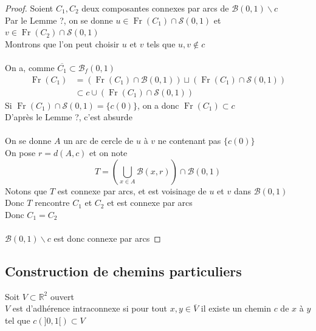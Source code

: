 \documentclass{article}
\begin{document}
\begin{flushleft}
\begin{proof}
    Soient $C_1, C_2$ deux composantes connexes par arcs de $\mathcal{B}(0, 1) \backslash c$\\
    Par le Lemme ?, on se donne $u \in \operatorname{Fr}(C_1) \cap \mathcal{S}(0, 1)$ et
    $v \in \operatorname{Fr}(C_2) \cap \mathcal{S}(0, 1)$\\
    Montrons que l'on peut choisir $u$ et $v$ tels que $u, v \notin c$
    \\~\\
    On a, comme $\overline{C_1} \subset \mathcal{B}_f(0, 1)$
    \begin{align*}
        \operatorname{Fr}(C_1) &= (\operatorname{Fr}(C_1) \cap \mathcal{B}(0, 1))
        \sqcup (\operatorname{Fr}(C_1) \cap \mathcal{S}(0, 1))\\
        &\subset c \cup (\operatorname{Fr}(C_1) \cap \mathcal{S}(0, 1))
    \end{align*}
    Si $\operatorname{Fr}(C_1) \cap \mathcal{S}(0, 1) = \{ c(0) \}$, on a donc $\operatorname{Fr}(C_1) \subset c$\\
    D'après le Lemme ?, c'est absurde
    \\~\\
    On se donne $A$ un arc de cercle de $u$ à $v$ ne contenant pas $\{ c(0) \}$\\
    On pose $r = d(A, c)$ et on note
    \[ T = \left( \bigcup_{x \in A} \mathcal{B}(x, r) \right) \cap \mathcal{B}(0, 1)\]
    Notons que $T$ est connexe par arcs, et est voisinage de $u$ et $v$ dans $\mathcal{B}(0, 1)$\\
    Donc $T$ rencontre $C_1$ et $C_2$ et est connexe par arcs\\
    Donc $C_1 = C_2$
    \\~\\
    $\mathcal{B}(0, 1) \backslash c$ est donc connexe par arcs
\end{proof}

\subsection{Construction de chemins particuliers}

\begin{tcolorbox}[colback = yellow!60!white, colframe = orange!90!white, title = Définition 4]
    Soit $V \subset \mathbb{R}^2$ ouvert\\
    $V$ est d'adhérence intraconnexe si pour tout $x, y \in \overline{V}$ il existe un chemin $c$ de $x$ à $y$
    tel que $c(]0, 1[) \subset V$
\end{tcolorbox}


\end{flushleft}
\end{document}
